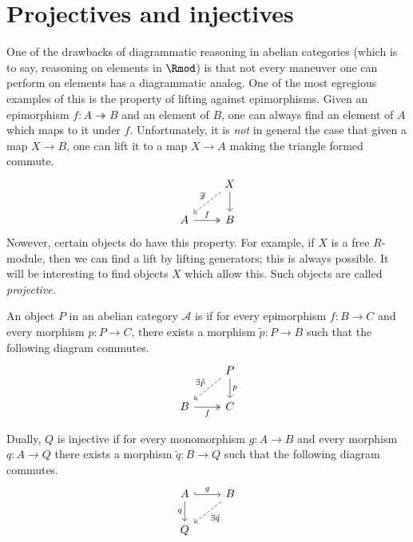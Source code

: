 \documentclass[main.tex]{subfiles}
\begin{document}
\section{Projectives and injectives}
\label{ssc:projectives_and_injectives}

One of the drawbacks of diagrammatic reasoning in abelian categories (which is to say, reasoning on elements in $\Rmod$) is that not every maneuver one can perform on elements has a diagrammatic analog. One of the most egregious examples of this is the property of lifting against epimorphisms. Given an epimorphism $f\colon A \twoheadrightarrow B$ and an element of $B$, one can always find an element of $A$ which maps to it under $f$. Unfortunately, it is \emph{not} in general the case that given a map $X \to B$, one can lift it to a map $X \to A$ making the triangle formed commute.
\begin{equation*}
  \begin{tikzcd}
    & X
    \arrow[d]
    \arrow[dl, swap, dashed, "\not\exists"]
    \\
    A
    \arrow[r, two heads, "f"]
    & B
  \end{tikzcd}
\end{equation*}
Nowever, certain objects do have this property. For example, if $X$ is a free $R$-module, then we can find a lift by lifting generators; this is always possible. It will be interesting to find objects $X$ which allow this. Such objects are called \emph{projective.}

\begin{definition}
  \label{def:projective_injective}
  An object $P$ in an abelian category $\mathcal{A}$ is  if for every epimorphism $f\colon B \to C$ and every morphism $p\colon P \to C$, there exists a morphism $\tilde{p}\colon P \to B$ such that the following diagram commutes.
  \begin{equation*}
    \begin{tikzcd}
      & P
      \arrow[d, "p"]
      \arrow[dl, dashed, swap, "\exists\tilde{p}"]
      \\
      B
      \arrow[r, twoheadrightarrow, swap, "f"]
      & C
    \end{tikzcd}
  \end{equation*}

  Dually, $Q$ is injective if for every monomorphism $g\colon A \to B$ and every morphism $q\colon A \to Q$ there exists a morphism $\tilde{q}\colon B \to Q$ such that the following diagram commutes.
  \begin{equation*}
    \begin{tikzcd}
      A
      \arrow[r, hookrightarrow, "g"]
      \arrow[d, swap, "q"]
      & B
      \arrow[dl, dashed, "\exists \tilde{q}"]
      \\
      Q
    \end{tikzcd}
  \end{equation*}
\end{definition}
\end{document}
